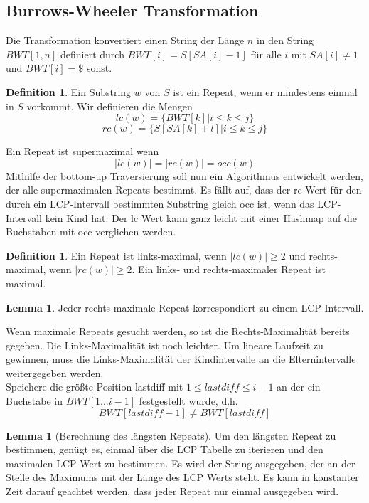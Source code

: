 \documentclass[a4paper, 12pt]{article}
\theoremstyle{plain}
\theoremstyle{definition}
\newtheorem{definition}[theorem]{Definition} %
\theoremstyle{lemma}
\newtheorem{lemma}[theorem]{Lemma}
\theoremstyle{remark}
\theoremstyle{corollary}
\theoremstyle{example}
\begin{document}
	\subsection{Burrows-Wheeler Transformation}
	Die Transformation konvertiert einen String der Länge $n$ in den String $BWT[1,n]$ definiert durch $BWT[i] = S[SA[i]-1]$ für alle $i$ mit $SA[i]\neq 1$ und $BWT[i] = \$$ sonst.
	\begin{definition}
		Ein Substring $w$ von $S$ ist ein Repeat, wenn er mindestens einmal in $S$ vorkommt. Wir definieren die Mengen
		\[lc(w) = \{BWT[k] | i \leq k \leq j\}\]
		\[rc(w) = \{S[SA[k] + l] | i \leq k \leq j\}\]
	\end{definition} 
	Ein Repeat ist supermaximal wenn \[\left|lc(w)\right| = \left|rc(w)\right| = occ(w)\]
	Mithilfe der bottom-up Traversierung soll nun ein Algorithmus entwickelt werden, der alle supermaximalen Repeats bestimmt. Es fällt auf, dass der rc-Wert für den durch ein LCP-Intervall bestimmten Substring gleich occ ist, wenn das LCP-Intervall kein Kind hat. Der lc Wert kann ganz leicht mit einer Hashmap auf die Buchstaben mit occ verglichen werden.
	\begin{definition}
		Ein Repeat ist links-maximal, wenn $\left|lc(w)\right| \geq 2$ und rechts-maximal, wenn $\left|rc(w)\right| \geq 2$. Ein links- und rechts-maximaler Repeat ist maximal.\\
	\end{definition}
	\begin{lemma}
		Jeder rechts-maximale Repeat korrespondiert zu einem LCP-Intervall.
	\end{lemma}
	Wenn maximale Repeats gesucht werden, so ist die Rechts-Maximalität bereits gegeben. Die Links-Maximalität ist noch leichter. Um lineare Laufzeit zu gewinnen, muss die Links-Maximalität der Kindintervalle an die Elternintervalle weitergegeben werden.\\
	Speichere die größte Position lastdiff mit $1\leq lastdiff \leq i-1$ an der ein Buchstabe in $BWT[1...i-1]$ festgestellt wurde, d.h. \[BWT[lastdiff-1] \neq BWT[lastdiff]\]
	\begin{lemma}[Berechnung des längsten Repeats]
		Um den längsten Repeat zu bestimmen, genügt es, einmal über die LCP Tabelle zu iterieren und den maximalen LCP Wert zu bestimmen. Es wird der String ausgegeben, der an der Stelle des Maximums mit der Länge des LCP Werts steht. Es kann in konstanter Zeit darauf geachtet werden, dass jeder Repeat nur einmal ausgegeben wird.
	\end{lemma}
\end{document}
